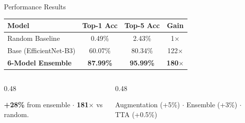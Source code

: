 \documentclass[aspectratio=169, 11pt]{beamer}
\begin{document}
\begin{frame}{Performance Results}
    \begin{center}
        \scriptsize
        \begin{tabular}{lccc}
            \toprule
            \textbf{Model} & \textbf{Top-1 Acc} & \textbf{Top-5 Acc} & \textbf{Gain} \\
            \midrule
            Random Baseline & 0.49\% & 2.43\% & 1$\times$ \\
            Base (EfficientNet-B3) & 60.07\% & 80.34\% & 122$\times$ \\
            \rowcolor{draculacurrent}
            \textbf{6-Model Ensemble} & \textbf{87.99\%} & \textbf{95.99\%} & \textbf{180$\times$} \\
            \bottomrule
        \end{tabular}
    \end{center}

    \begin{columns}[T, onlytextwidth]
        \begin{column}{0.48\textwidth}
            \begin{tcolorbox}[greenbox_tcb={Achievements}]
                \scriptsize \textbf{+28\%} from ensemble $\cdot$ \textbf{181$\times$} vs random.
            \end{tcolorbox}
        \end{column}
        \begin{column}{0.48\textwidth}
            \begin{tcolorbox}[draculabox={Contributions}]
                \tiny Augmentation (+5\%) $\cdot$ Ensemble (+3\%) $\cdot$ TTA (+0.5\%)
            \end{tcolorbox}
        \end{column}
    \end{columns}
\end{frame}
\end{document}
